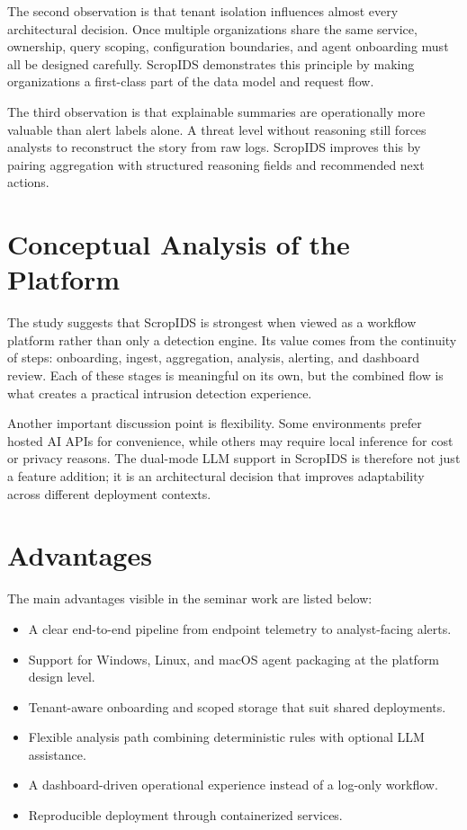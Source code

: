\documentclass[12pt,a4paper]{report}
\begin{document}
The second observation is that tenant isolation influences almost every architectural decision. Once multiple organizations share the same service, ownership, query scoping, configuration boundaries, and agent onboarding must all be designed carefully. ScropIDS demonstrates this principle by making organizations a first-class part of the data model and request flow.

The third observation is that explainable summaries are operationally more valuable than alert labels alone. A threat level without reasoning still forces analysts to reconstruct the story from raw logs. ScropIDS improves this by pairing aggregation with structured reasoning fields and recommended next actions.

\section{Conceptual Analysis of the Platform}
The study suggests that ScropIDS is strongest when viewed as a workflow platform rather than only a detection engine. Its value comes from the continuity of steps: onboarding, ingest, aggregation, analysis, alerting, and dashboard review. Each of these stages is meaningful on its own, but the combined flow is what creates a practical intrusion detection experience.

Another important discussion point is flexibility. Some environments prefer hosted AI APIs for convenience, while others may require local inference for cost or privacy reasons. The dual-mode LLM support in ScropIDS is therefore not just a feature addition; it is an architectural decision that improves adaptability across different deployment contexts.

\section{Advantages}
The main advantages visible in the seminar work are listed below:
\begin{itemize}
    \item A clear end-to-end pipeline from endpoint telemetry to analyst-facing alerts.
    \item Support for Windows, Linux, and macOS agent packaging at the platform design level.
    \item Tenant-aware onboarding and scoped storage that suit shared deployments.
    \item Flexible analysis path combining deterministic rules with optional LLM assistance.
    \item A dashboard-driven operational experience instead of a log-only workflow.
    \item Reproducible deployment through containerized services.
\end{itemize}
\end{document}
